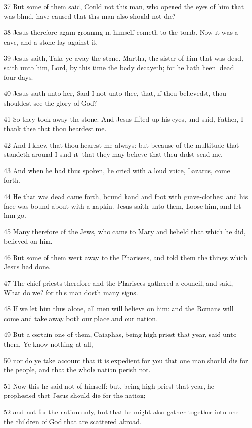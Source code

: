 \par 37 But some of them said, Could not this man, who opened the eyes of him that was blind, have caused that this man also should not die?
\par 38 Jesus therefore again groaning in himself cometh to the tomb. Now it was a cave, and a stone lay against it.
\par 39 Jesus saith, Take ye away the stone. Martha, the sister of him that was dead, saith unto him, Lord, by this time the body decayeth; for he hath been [dead] four days.
\par 40 Jesus saith unto her, Said I not unto thee, that, if thou believedst, thou shouldest see the glory of God?
\par 41 So they took away the stone. And Jesus lifted up his eyes, and said, Father, I thank thee that thou heardest me.
\par 42 And I knew that thou hearest me always: but because of the multitude that standeth around I said it, that they may believe that thou didst send me.
\par 43 And when he had thus spoken, he cried with a loud voice, Lazarus, come forth.
\par 44 He that was dead came forth, bound hand and foot with grave-clothes; and his face was bound about with a napkin. Jesus saith unto them, Loose him, and let him go.
\par 45 Many therefore of the Jews, who came to Mary and beheld that which he did, believed on him.
\par 46 But some of them went away to the Pharisees, and told them the things which Jesus had done.
\par 47 The chief priests therefore and the Pharisees gathered a council, and said, What do we? for this man doeth many signs.
\par 48 If we let him thus alone, all men will believe on him: and the Romans will come and take away both our place and our nation.
\par 49 But a certain one of them, Caiaphas, being high priest that year, said unto them, Ye know nothing at all,
\par 50 nor do ye take account that it is expedient for you that one man should die for the people, and that the whole nation perish not.
\par 51 Now this he said not of himself: but, being high priest that year, he prophesied that Jesus should die for the nation;
\par 52 and not for the nation only, but that he might also gather together into one the children of God that are scattered abroad.
